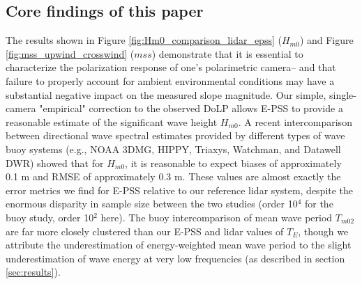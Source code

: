 \documentclass[letterpaper,journal]{IEEEtran}
\begin{document}
	\subsection{Core findings of this paper}
	
	The results shown in Figure \ref{fig:Hm0_comparison_lidar_epss} ($H_{m0}$) and Figure \ref{fig:mss_upwind_crosswind} ($mss$) demonstrate that it is essential to characterize the polarization response of one's polarimetric camera-- and that failure to properly account for ambient environmental conditions may have a substantial negative impact on the measured slope magnitude. Our simple, single-camera "empirical" correction to the observed DoLP allows E-PSS to provide a reasonable estimate of the significant wave height $H_{m0}$. A recent intercomparison \cite{jensen_quantifying_2021} between directional wave spectral estimates provided by different types of wave buoy systems (e.g., NOAA 3DMG, HIPPY, Triaxys, Watchman, and Datawell DWR) showed that for $H_{m0}$, it is reasonable to expect biases of approximately 0.1 m and RMSE of approximately 0.3 m. These values are almost exactly the error metrics we find for E-PSS relative to our reference lidar system, despite the enormous disparity in sample size between the two studies (order 10$^4$ for the buoy study, order 10$^2$ here). The buoy intercomparison of mean wave period $T_{m02}$ are far more closely clustered than our E-PSS and lidar values of $T_E$, though we attribute the underestimation of energy-weighted mean wave period to the slight underestimation of wave energy at very low frequencies (as described in section \ref{sec:results}).
	
\end{document}
